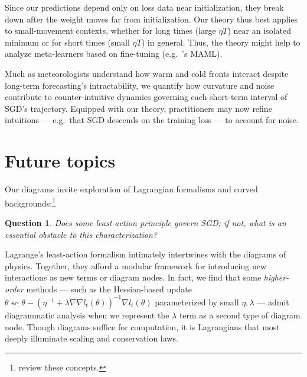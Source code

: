 \documentclass[openany, notitlepage, justified]{tufte-book}
\theoremstyle{plain}
\newtheorem{quest}{Question}
\theoremstyle{definition}
\begin{document}
    Since our predictions depend only on loss data near initialization, they
    break down after the weight moves far from initialization.  Our theory thus
    best applies to small-movement contexts, whether for long times (large
    $\eta T$) near an isolated minimum or for short times (small $\eta T$) in
    general.  Thus, the theory might help to analyze meta-learners based on
    fine-tuning (e.g.\ \citep{fi17}'s MAML).

    Much as meteorologists understand how warm and cold fronts interact despite
    long-term forecasting's intractability, we quantify how curvature and noise
    contribute to counter-intuitive dynamics governing each short-term interval
    of SGD's trajectory.  Equipped with our theory, practitioners may now
    refine intuitions --- e.g.\ that SGD descends on the training loss --- to
    account for noise.

    \section{Future topics}                                      \label{appendix:future}

        Our diagrams invite exploration of Lagrangian formalisms and curved
        backgrounds:\footnote{
            \citet{la60, la51} review these concepts.
        }
        \begin{quest}
            Does some least-action principle govern SGD; if not, what is an
            essential obstacle to this characterization?
        \end{quest}
        Lagrange's least-action formalism intimately intertwines with the
        diagrams of physics.  Together, they afford a modular framework for
        introducing new interactions as new terms or diagram nodes.  In fact,
        we find that some \emph{higher-order} methods --- such as the
        Hessian-based update
        $
            \theta \leftsquigarrow
            \theta -
            (\eta^{-1} + \lambda \nabla \nabla l_t(\theta))^{-1}
            \nabla l_t(\theta)
        $
        parameterized by small $\eta, \lambda$ --- admit diagrammatic analysis
        when we represent the $\lambda$ term as a second type of diagram node.
        Though diagrams suffice for computation, it is Lagrangians that most
        deeply illuminate scaling and conservation laws.
\end{document}
